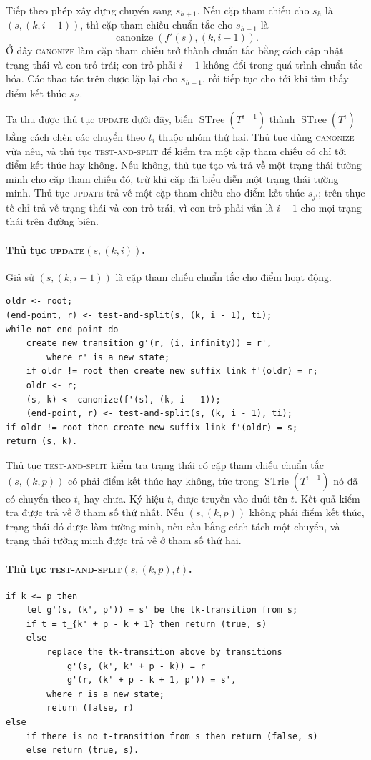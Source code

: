 \documentclass[11pt]{article}
\newcommand{\STrie}{\operatorname{STrie}}
\newcommand{\STree}{\operatorname{STree}}
\begin{document}
Tiếp theo phép xây dựng chuyển sang $s_{h+1}$. Nếu cặp tham chiếu cho $s_h$ là
$(s,(k,i-1))$, thì cặp tham chiếu chuẩn tắc cho $s_{h+1}$ là
\[
  \operatorname{canonize}(f'(s),(k,i-1)).
\]
Ở đây \textsc{canonize} làm cặp tham chiếu trở thành chuẩn tắc bằng cách cập
nhật trạng thái và con trỏ trái; con trỏ phải $i-1$ không đổi trong quá trình
chuẩn tắc hóa. Các thao tác trên được lặp lại cho $s_{h+1}$, rồi tiếp tục cho
tới khi tìm thấy điểm kết thúc $s_{j'}$.

Ta thu được thủ tục \textsc{update} dưới đây, biến $\STree(T^{i-1})$ thành
$\STree(T^i)$ bằng cách chèn các chuyển theo $t_i$ thuộc nhóm thứ hai. Thủ tục
dùng \textsc{canonize} vừa nêu, và thủ tục \textsc{test-and-split} để kiểm tra
một cặp tham chiếu có chỉ tới điểm kết thúc hay không. Nếu không, thủ tục tạo
và trả về một trạng thái tường minh cho cặp tham chiếu đó, trừ khi cặp đã biểu
diễn một trạng thái tường minh. Thủ tục \textsc{update} trả về một cặp tham
chiếu cho điểm kết thúc $s_{j'}$; trên thực tế chỉ trả về trạng thái và con
trỏ trái, vì con trỏ phải vẫn là $i-1$ cho mọi trạng thái trên đường biên.

\paragraph{Thủ tục \textsc{update}$(s,(k,i))$.}
Giả sử $(s,(k,i-1))$ là cặp tham chiếu chuẩn tắc cho điểm hoạt động.
\begin{verbatim}
oldr <- root;
(end-point, r) <- test-and-split(s, (k, i - 1), ti);
while not end-point do
    create new transition g'(r, (i, infinity)) = r',
        where r' is a new state;
    if oldr != root then create new suffix link f'(oldr) = r;
    oldr <- r;
    (s, k) <- canonize(f'(s), (k, i - 1));
    (end-point, r) <- test-and-split(s, (k, i - 1), ti);
if oldr != root then create new suffix link f'(oldr) = s;
return (s, k).
\end{verbatim}

Thủ tục \textsc{test-and-split} kiểm tra trạng thái có cặp tham chiếu chuẩn
tắc $(s,(k,p))$ có phải điểm kết thúc hay không, tức trong $\STrie(T^{i-1})$
nó đã có chuyển theo $t_i$ hay chưa. Ký hiệu $t_i$ được truyền vào dưới tên
$t$. Kết quả kiểm tra được trả về ở tham số thứ nhất. Nếu $(s,(k,p))$ không
phải điểm kết thúc, trạng thái đó được làm tường minh, nếu cần bằng cách tách
một chuyển, và trạng thái tường minh được trả về ở tham số thứ hai.

\paragraph{Thủ tục \textsc{test-and-split}$(s,(k,p),t)$.}
\begin{verbatim}
if k <= p then
    let g'(s, (k', p')) = s' be the tk-transition from s;
    if t = t_{k' + p - k + 1} then return (true, s)
    else
        replace the tk-transition above by transitions
            g'(s, (k', k' + p - k)) = r
            g'(r, (k' + p - k + 1, p')) = s',
        where r is a new state;
        return (false, r)
else
    if there is no t-transition from s then return (false, s)
    else return (true, s).
\end{verbatim}
\end{document}
